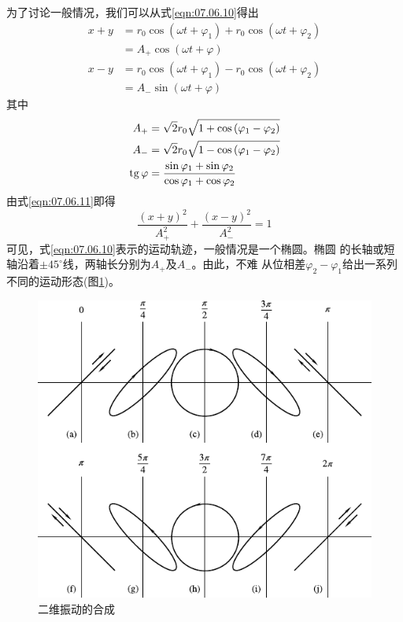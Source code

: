 为了讨论一般情况，我们可以从式\eqref{eqn:07.06.10}得出
\begin{equation}\label{eqn:07.06.11}
  \begin{split}
    x + y &= r _ { 0 } \cos \left( \omega t + \varphi _ { 1 } \right) + r _ { 0 } \cos \left( \omega t + \varphi _ { 2 } \right) \\[-0.5em]
    &= A _ { + } \cos \left( \omega t + \varphi \right) \\
    x - y &= r _ { 0 } \cos \left( \omega t + \varphi _ { 1 } \right) - r _ { 0 } \cos \left( \omega t + \varphi _ { 2 } \right) \\[-0.5em]
    &= A _ { - } \sin \left( \omega t + \varphi \right)
  \end{split}
\end{equation}
其中\vspace{-1.56em}
\begin{equation}\label{eqn:07.06.12}
  \begin{split}
    A _ { + } &= \sqrt { 2 } r _ { 0 } \sqrt { 1 + \cos \left( \varphi _ { 1 } - \varphi _ { 2 } \right) } \\
    A _ { - } &= \sqrt { 2 } r _ { 0 } \sqrt { 1 - \cos \left( \varphi _ { 1 } - \varphi _ { 2 } \right) } \\
    \operatorname{tg} \varphi &= \frac { \sin \varphi _ { 1 } + \sin \varphi _ { 2 } } { \cos \varphi _ { 1 } + \cos \varphi _ { 2 } }
  \end{split}
\end{equation}
由式\eqref{eqn:07.06.11}即得
\begin{equation*}
  \frac { \left( x + y \right) ^ { 2 } } { A _ { + } ^ { 2 } } + \frac { \left( x - y \right) ^ { 2 } } { A _ { - } ^ { 2 } } = 1
\end{equation*}
可见，式\eqref{eqn:07.06.10}表示的运动轨迹，一般情况是一个椭圆。椭圆
的长轴或短轴沿着$ \pm 45 ^ { \circ } $线，两轴长分别为$ A _ { + } $及$ A _ { - } $。由此，不难
从位相差$ \varphi_{ 2 } - \varphi_{ 1 } $给出一系列不同的运动形态(图\ref{fig:07.12})。\vspace{1.56em}
\begin{figure}[h]
  \centering
  \includegraphics{figure/fig07.12}
  \caption{二维振动的合成}
  \label{fig:07.12}
\end{figure}
